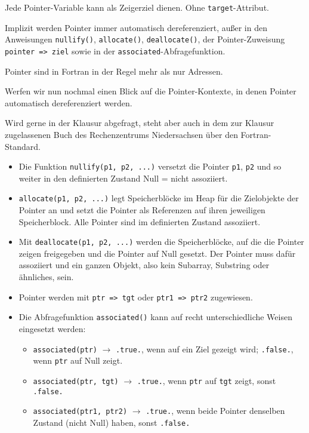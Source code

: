 Jede Pointer-Variable kann als Zeigerziel dienen. Ohne \texttt{target}-Attribut.

Implizit werden Pointer immer automatisch dereferenziert, außer in den Anweisungen \texttt{nullify()}, \texttt{allocate()}, \texttt{deallocate()}, der Pointer-Zuweisung \texttt{pointer => ziel} sowie in der \texttt{associated}-Abfragefunktion.

Pointer sind in Fortran in der Regel mehr als nur Adressen.

Werfen wir nun nochmal einen Blick auf die Pointer-Kontexte, in denen Pointer automatisch dereferenziert werden.

\begin{*anmerkung}
	Wird gerne in der Klausur abgefragt, steht aber auch in dem zur Klausur zugelassenen Buch des Rechenzentrums Niedersachsen über den Fortran-Standard.
\end{*anmerkung}

\begin{itemize}
	\item Die Funktion \texttt{nullify(p1, p2, ...)} versetzt die Pointer \texttt{p1}, \texttt{p2} und so weiter in den definierten Zustand Null = nicht assoziiert.
	\item \texttt{allocate(p1, p2, ...)} legt Speicherblöcke im Heap für die Zielobjekte der Pointer an und setzt die Pointer als Referenzen auf ihren jeweiligen Speicherblock. Alle Pointer sind im definierten Zustand assoziiert.
	\item Mit \texttt{deallocate(p1, p2, ...)} werden die Speicherblöcke, auf die die Pointer zeigen freigegeben und die Pointer auf Null gesetzt. Der Pointer muss dafür assoziiert und ein ganzen Objekt, also kein Subarray, Substring oder ähnliches, sein.
	\item Pointer werden mit \texttt{ptr => tgt} oder \texttt{ptr1 => ptr2} zugewiesen.
	\item Die Abfragefunktion \texttt{associated()} kann auf recht unterschiedliche Weisen eingesetzt werden:
	\begin{itemize}
		\item \texttt{associated(ptr)} $\to$ \texttt{.true.}, wenn auf ein Ziel gezeigt wird; \texttt{.false.}, wenn \texttt{ptr} auf Null zeigt.
		\item \texttt{associated(ptr, tgt)} $\to$ \texttt{.true.}, wenn \texttt{ptr} auf \texttt{tgt} zeigt, sonst \texttt{.false.}
		\item \texttt{associated(ptr1, ptr2)} $\to$ \texttt{.true.}, wenn beide Pointer denselben Zustand (nicht Null) haben, sonst \texttt{.false.}
	\end{itemize}
\end{itemize}

